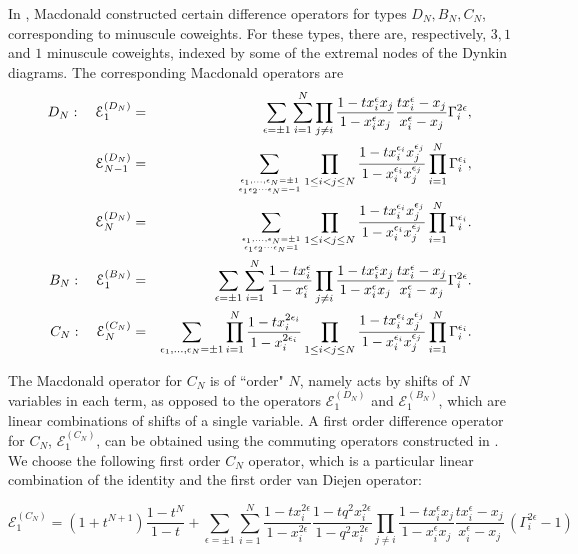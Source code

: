 \documentclass[12pt]{amsart}
\numberwithin{equation}{section}
\numberwithin{table}{section}
\begin{document}
In \cite{macdoroot}, Macdonald constructed certain difference operators for types $D_N,B_N,C_N$, corresponding to minuscule coweights. For these types, there are, respectively,
$3,1$ and $1$ minuscule coweights, indexed by  some of the extremal nodes of the Dynkin diagrams. The corresponding Macdonald operators are
\begin{eqnarray}
D_N:\quad {\mathcal E}_1^{(D_N)}&=&\sum_{\epsilon=\pm 1}\sum_{i=1}^N \prod_{j\neq i} \frac{1-t x_i^\epsilon x_j}{1-x_i^\epsilon x_j}
\frac{t x_i^\epsilon-x_j}{x_i^\epsilon-x_j} \Gamma_i^{2\epsilon} ,\label{macDN1}\\
{\mathcal E}_{N-1}^{(D_N)}&=&  \sum_{\epsilon_1,...,\epsilon_N=\pm 1\atop \epsilon_1\epsilon_2\cdots \epsilon_N=-1}  
\prod_{1\leq i<j\leq N} \frac{1-t x_i^{\epsilon_i} x_j^{\epsilon_j}}{1-x_i^{\epsilon_i}x_j^{\epsilon_j}} 
\prod_{i=1}^N \Gamma_i^{\epsilon_i}, \label{macDN2}\\
{\mathcal E}_N^{(D_N)}&=&  
\sum_{\epsilon_1,...,\epsilon_N=\pm 1\atop \epsilon_1\epsilon_2\cdots \epsilon_N=1}  \prod_{1\leq i<j\leq N} \frac{1-t x_i^{\epsilon_i} x_j^{\epsilon_j}}{1-x_i^{\epsilon_i}x_j^{\epsilon_j}} \prod_{i=1}^N \Gamma_i^{\epsilon_i}.\label{macDN3}\\
B_N:\quad {\mathcal E}_{1}^{(B_N)}&=&\sum_{\epsilon=\pm 1}
\sum_{i=1}^N \frac{1-t x_i^{\epsilon}}{1-x_i^{\epsilon}}
\prod_{j\neq i} \frac{1-t x_i^{\epsilon} x_j}{1-x_i^{\epsilon}x_j}\frac{t x_i^{\epsilon} -x_j}{x_i^{\epsilon}-x_j}
\Gamma_i^{2\epsilon}.\label{macBN}\\
C_N:\quad {\mathcal E}_{N}^{(C_N)}&=&\sum_{\epsilon_1,...,\epsilon_N=\pm 1}\prod_{i=1}^N
\frac{1-t x_i^{2\epsilon_i}}{1-x_i^{2\epsilon_i}} 
 \prod_{1\leq i<j\leq N}  \frac{1-t x_i^{\epsilon_i}x_j^{\epsilon_j}}{1-x_i^{\epsilon_i}x_j^{\epsilon_j}}
\prod_{i=1}^N \Gamma_i^{\epsilon_i}.\label{macCN}
\end{eqnarray}

The Macdonald operator for $C_N$ is of ``order" $N$, namely acts by shifts of  $N$ variables in each term, as opposed to the operators ${\mathcal E}_1^{(D_N)}$ and 
${\mathcal E}_{1}^{(B_N)}$, which are linear combinations of shifts of a single variable.
A first order difference operator for $C_N$, $ {\mathcal E}_{1}^{(C_N)}$, can be obtained using the commuting operators constructed in \cite{vandiej,vandiejtwo}. 
We choose the following first order $C_N$ operator, which is a particular linear combination of the identity and the first order van Diejen operator:

\begin{equation}
{\mathcal E}_{1}^{(C_N)}=(1+t^{N+1})\frac{1-t^{N}}{1-t}+ \sum_{\epsilon=\pm 1}\sum_{i=1}^N \frac{1-t x_i^{2\epsilon}}{1-x_i^{2\epsilon}} 
\frac{1-t q^2 x_i^{2\epsilon}}{1-q^2 x_i^{2\epsilon}} \prod_{j\neq i}  \frac{1-t x_i^{\epsilon}x_j}{1-x_i^{\epsilon}x_j}
 \frac{t x_i^{\epsilon}-x_j}{x_i^{\epsilon}-x_j} \, (\Gamma_i^{2\epsilon}-1) \label{macCN1}
\end{equation}
\end{document}
